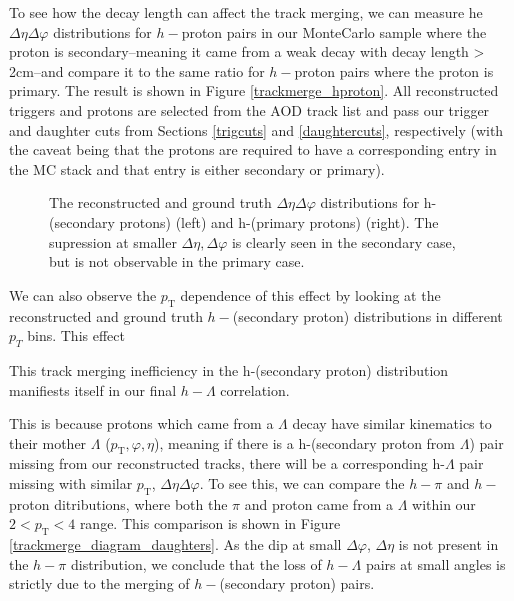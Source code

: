 \documentclass[ALICE,manyauthors]{ALICE_analysis_notes}
\begin{document}
\begin{itemize}
To see how the decay length can affect the track merging, we can measure he $\Delta\eta\Delta\varphi$ distributions for $h-$proton pairs in our MonteCarlo sample where the proton is secondary--meaning it came from a weak decay with decay length > 2cm--and compare it to the same ratio for $h-$proton pairs where the proton is primary. The result is shown in Figure \ref{trackmerge_hproton}. All reconstructed triggers and protons are selected from the AOD track list and pass our trigger and daughter cuts from Sections \ref{trigcuts} and \ref{daughtercuts}, respectively (with the caveat being that the protons are required to have a corresponding entry in the MC stack and that entry is either secondary or primary).

\begin{figure}[ht]
\centering
\begin{subfigure}{
\texttt{[image: figures/track\_merging\_hproton\_secondary.pdf]}}
\end{subfigure}
\begin{subfigure}{
\texttt{[image: figures/track\_merging\_hproton\_primary.pdf]}}
\end{subfigure}
\caption{The  reconstructed and ground truth $\Delta\eta\Delta\varphi$ distributions for h-(secondary protons) (left) and h-(primary protons) (right). The supression at smaller $\Delta\eta, \Delta\varphi$ is clearly seen in the secondary case, but is not observable in the primary case.}
\label{trackmerge_diagram_primary_secondary}
\end{figure}

We can also observe the $p_\text{T}$ dependence of this effect by looking at the reconstructed and ground truth $h-$(secondary proton) distributions in different $p_{T}$ bins. This effect 







This track merging inefficiency in the h-(secondary proton) distribution manifiests itself in our final $h-\Lambda$ correlation. 


This is because protons which came from a $\Lambda$ decay have similar kinematics to their mother $\Lambda$ ($p_\text{T}, \varphi, \eta$), meaning if there is a h-(secondary proton from $\Lambda$) pair missing from our reconstructed tracks, there will be a corresponding h-$\Lambda$ pair missing with similar $p_\text{T}$, $\Delta\eta\Delta\varphi$. To see this, we can compare the $h-\pi$ and $h-$proton ditributions, where both the $\pi$ and proton came from a $\Lambda$ within our $2 < p_\text{T} < 4$ range. This comparison is shown in Figure \ref{trackmerge_diagram_daughters}. As the dip at small $\Delta\varphi$, $\Delta\eta$ is not present in the $h-\pi$ distribution, we conclude that the loss of $h-\Lambda$ pairs at small angles is strictly due to the merging of $h-$(secondary proton) pairs.


\end{itemize}
\end{document}
